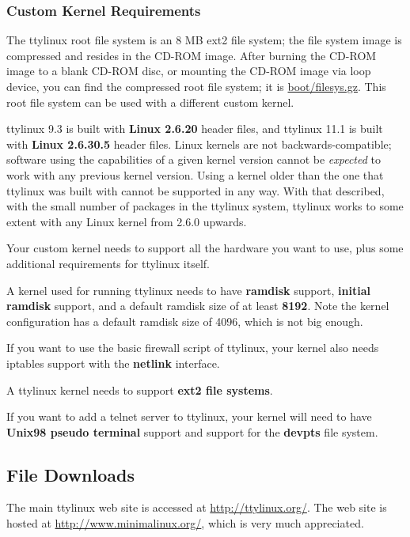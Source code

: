\documentclass[10pt]{article}
\begin{document}
\subsubsection{Custom Kernel Requirements}
\label{customkernel}

The ttylinux root file system is an 8 MB ext2 file system; the file system
image is compressed and resides in the CD-ROM image. After burning the CD-ROM
image to a blank CD-ROM disc, or mounting the CD-ROM image via loop device,
you can find the compressed root file system; it is \url{boot/filesys.gz}.
This root file system can be used with a different custom kernel.

ttylinux 9.3 is built with {\bf Linux 2.6.20} header files, and ttylinux 11.1
is built with {\bf Linux 2.6.30.5} header files. Linux kernels are not
backwards-compatible; software using the capabilities of a given kernel version
cannot be {\it expected} to work with any previous kernel version. Using a
kernel older than the one that ttylinux was built with cannot be supported in
any way. With that described, with the small number of packages in the ttylinux
system, ttylinux works to some extent with any Linux kernel from 2.6.0 upwards.

Your custom kernel needs to support all the hardware you want to use, plus some
additional requirements for ttylinux itself.

A kernel used for running ttylinux needs to have {\bf ramdisk} support, {\bf
initial ramdisk} support, and a default ramdisk size of at least {\bf 8192}.
Note the kernel configuration has a default ramdisk size of 4096, which is not
big enough.

If you want to use the basic firewall script of ttylinux, your kernel also
needs iptables support with the {\bf netlink} interface.

A ttylinux kernel needs to support {\bf ext2 file systems}.

If you want to add a telnet server to ttylinux, your kernel will need to have
{\bf Unix98 pseudo terminal} support and support for the {\bf devpts} file
system.

\subsection{File Downloads}

The main ttylinux web site is accessed at \url{http://ttylinux.org/}. The web
site is hosted at \url{http://www.minimalinux.org/}, which is very much
appreciated.
\end{document}
